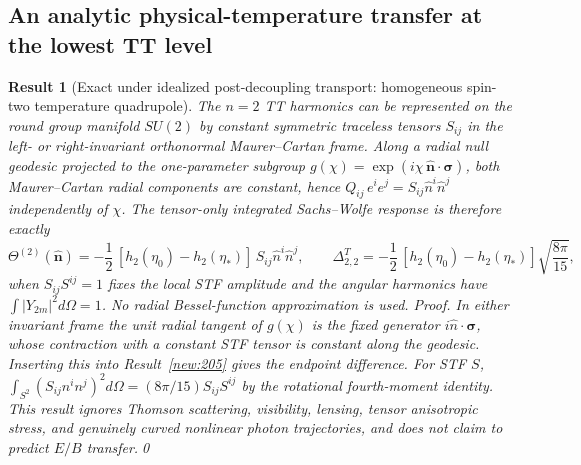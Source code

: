 \documentclass[aps,prd,onecolumn,notitlepage,groupedaddress,11pt]{revtex4-2}
\newtheorem{result}{Result}
\begin{document}
\subsection{An analytic physical-temperature transfer at the lowest TT level}
\begin{result}[\textsf{Exact under idealized post-decoupling transport}: homogeneous spin-two temperature quadrupole]\label{new:219}
The $n=2$ TT harmonics can be represented on the round group manifold $SU(2)$ by constant symmetric traceless tensors $S_{ij}$ in the left- or right-invariant orthonormal Maurer--Cartan frame. Along a radial null geodesic projected to the one-parameter subgroup $g(\chi)=\exp(i\chi\,\widehat{\boldsymbol n}\cdot\boldsymbol\sigma)$, both Maurer--Cartan radial components are constant, hence $Q_{ij}\,e^ie^j=S_{ij}\widehat n^i\widehat n^j$ independently of $\chi$. The tensor-only integrated Sachs--Wolfe response is therefore exactly
\begin{equation}\label{eq:exactn2temperature}
\Theta^{(2)}(\widehat{\boldsymbol n})=-\frac12\,[h_2(\eta_0)-h_2(\eta_*)]\,S_{ij}\widehat n^i\widehat n^j,\qquad
\Delta_{2,2}^{T}= -\frac12\,[h_2(\eta_0)-h_2(\eta_*)]\sqrt{\frac{8\pi}{15}},
\end{equation}
when $S_{ij}S^{ij}=1$ fixes the local STF amplitude and the angular harmonics have $\int |Y_{2m}|^2d\Omega=1$. No radial Bessel-function approximation is used. \textit{Proof.} In either invariant frame the unit radial tangent of $g(\chi)$ is the fixed generator $i\widehat n\cdot\boldsymbol\sigma$, whose contraction with a constant STF tensor is constant along the geodesic. Inserting this into Result~\ref{new:205} gives the endpoint difference. For STF $S$, $\int_{S^2}(S_{ij}n^in^j)^2d\Omega=(8\pi/15)S_{ij}S^{ij}$ by the rotational fourth-moment identity. This result ignores Thomson scattering, visibility, lensing, tensor anisotropic stress, and genuinely curved nonlinear photon trajectories, and does not claim to predict $E/B$ transfer.\qed
\end{result}
\end{document}

